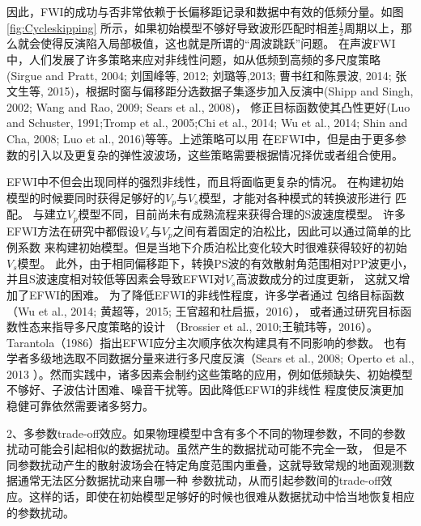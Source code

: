 因此，FWI的成功与否非常依赖于长偏移距记录和数据中有效的低频分量。如图\ref{fig:Cycleskipping}
所示，如果初始模型不够好导致波形匹配时相差$\frac{1}{2}$周期以上，那么就会使得反演陷入局部极值，这也就是所谓的“周波跳跃”问题。
在声波FWI中，人们发展了许多策略来应对非线性问题，如从低频到高频的多尺度策略(Sirgue and
Pratt, 2004\cite{sirgue.pratt:2004}; 刘国峰等, 2012\cite{刘国峰2012};
刘璐等,2013\cite{刘璐2013}; 曹书红和陈景波, 2014\cite{曹书红2014}; 
张文生等, 2015\cite{张文生2015})，根据时窗与偏移距分选数据子集逐步加入反演中(Shipp and
Singh, 2002\cite{shipp:2002}; Wang and Rao, 2009\cite{WangEtAl2009}; Sears et al., 2008\cite{sears2008})，
修正目标函数使其凸性更好(Luo and Schuster, 1991\cite{luo1991};Tromp et al.,
2005\cite{tromp2005seismic};Chi
et al., 2014\cite{ChiEtAl2014}; Wu et al., 2014\cite{Wu2014b}; Shin and Cha,
2008\cite{shin.cha:2008}; Luo et al., 2016\cite{Luo2016})等等。上述策略可以用
在EFWI中，但是由于更多参数的引入以及更复杂的弹性波波场，这些策略需要根据情况择优或者组合使用。

EFWI中不但会出现同样的强烈非线性，而且将面临更复杂的情况。
在构建初始模型的时候要同时获得足够好的$V_p$与$V_s$模型，才能对各种模式的转换波形进行
匹配。
与建立$V_p$模型不同，目前尚未有成熟流程来获得合理的S波速度模型。
许多EFWI方法在研究中都假设$V_s$与$V_p$之间有着固定的泊松比，因此可以通过简单的比例系数
来构建初始模型。但是当地下介质泊松比变化较大时很难获得较好的初始$V_s$模型。
此外，由于相同偏移距下，转换PS波的有效散射角范围相对PP波更小，并且S波速度相对较低等因素会导致EFWI对$V_s$高波数成分的过度更新，
这就又增加了EFWI的困难。
为了降低EFWI的非线性程度，许多学者通过
包络目标函数（Wu et al., 2014\cite{Wu2014b}; 黄超等，2015\cite{黄超2015};
王官超和杜启振，2016\cite{王官超2016}），
或者通过研究目标函数性态来指导多尺度策略的设计
（Brossier et al., 2010\cite{BrossierEtAl2010};王毓玮等，2016\cite{王毓玮2016}）。
Tarantola（1986）\cite{tarantola:1986}指出EFWI应分主次顺序依次构建具有不同影响的参数。
也有学者多级地选取不同数据分量来进行多尺度反演（Sears et al., 2008\cite{sears2008}; Operto et al., 2013
\cite{operto2013guided}）。然而实践中，诸多因素会制约这些策略的应用，例如低频缺失、初始模型不够好、子波估计困难、噪音干扰等。因此降低EFWI的非线性
程度使反演更加稳健可靠依然需要诸多努力。

2、多参数trade-off效应。如果物理模型中含有多个不同的物理参数，不同的参数扰动可能会引起相似的数据扰动。虽然产生的数据扰动可能不完全一致，
但是不同参数扰动产生的散射波场会在特定角度范围内重叠，这就导致常规的地面观测数据通常无法区分数据扰动来自哪一种
参数扰动，从而引起参数间的trade-off效应。这样的话，即使在初始模型足够好的时候也很难从数据扰动中恰当地恢复相应的参数扰动。

